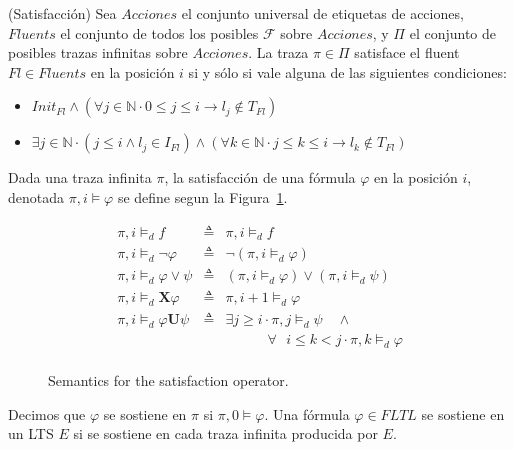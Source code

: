 \begin{definition}{(Satisfacción)}
Sea $Acciones$ el conjunto universal de etiquetas de acciones, $Fluents$ el 
conjunto de todos los posibles $\mathcal{F}$ sobre $Acciones$, 
y $\Pi$ el conjunto de posibles trazas infinitas sobre $Acciones$. La traza $\pi \in \Pi$ satisface el fluent $Fl \in Fluents$ en 
la posición $i$ si y sólo si vale alguna de las siguientes condiciones:

\begin{itemize}

\item
$Init_{Fl} \land (\forall j \in \mathbb{N} \cdot 0 \leq j \leq i \rightarrow 
l_{j} \notin T_{Fl})$

\item
$\exists j \in \mathbb{N} \cdot (j \leq i \land l_{j} \in I_{Fl}) \land 
(\forall k \in \mathbb{N} \cdot j \leq k \leq i \rightarrow 	l_{k} \notin 
T_{Fl})$

\end{itemize}

Dada una traza infinita $\pi$, la satisfacción de una fórmula $\varphi$ en la 
posición $i$, denotada $\pi, i\vDash \varphi$ se define segun la 
Figura~\ref{fig:satisfactionop}.

\begin{figure}[b]

$$\begin{array}{lcl}
\pi,i \models_{d} f &\triangleq & \pi,i \models_{d} f  \\
\pi,i \models_{d} \neg \varphi & \triangleq & \neg(\pi,i \models_{d} \varphi) \\
\pi,i \models_{d} \varphi \vee \psi &\triangleq& (\pi,i\models_{d} \varphi) 
\vee (\pi,i \models_{d} 
\psi) \\
\pi,i \models_{d} \mathbf{X} \varphi &\triangleq & \pi,i+1 \models_{d} \varphi 
\\
\pi,i \models_{d} \varphi \mathbf{U} \psi &\triangleq&\exists j \geq i \cdot 
\pi,j \models_{d} \psi 
\quad \wedge \\
& & \qquad \quad \forall \mbox{ }i \leq k < j \cdot \pi,k \models_{d} \varphi\\
\end{array}$$
\caption{Semantics for the satisfaction operator.}
\label{fig:satisfactionop}

\end{figure}

Decimos que $\varphi$ se sostiene en $\pi$ si $\pi, 0\vDash \varphi$. Una fórmula $\varphi \in FLTL$ se sostiene en un LTS $E$ si se sostiene en cada traza
infinita producida por $E$.

\end{definition}


